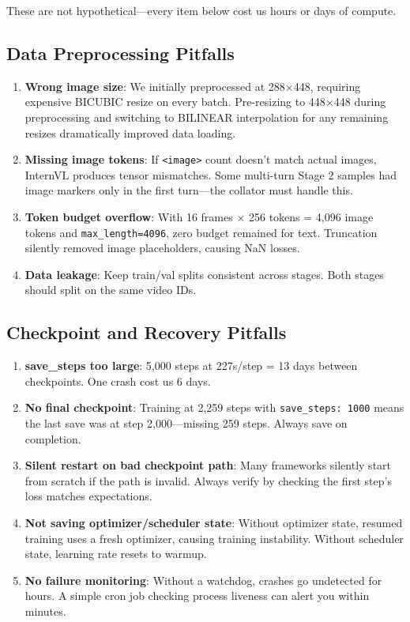 \documentclass[11pt,a4paper]{article}
\begin{document}
These are not hypothetical---every item below cost us hours or days of compute.

\subsection{Data Preprocessing Pitfalls}

\begin{enumerate}
    \item \textbf{Wrong image size}: We initially preprocessed at 288$\times$448, requiring expensive BICUBIC resize on every batch. Pre-resizing to 448$\times$448 during preprocessing and switching to BILINEAR interpolation for any remaining resizes dramatically improved data loading.
    \item \textbf{Missing image tokens}: If \texttt{<image>} count doesn't match actual images, InternVL produces tensor mismatches. Some multi-turn Stage 2 samples had image markers only in the first turn---the collator must handle this.
    \item \textbf{Token budget overflow}: With 16 frames $\times$ 256 tokens = 4,096 image tokens and \texttt{max\_length=4096}, zero budget remained for text. Truncation silently removed image placeholders, causing NaN losses.
    \item \textbf{Data leakage}: Keep train/val splits consistent across stages. Both stages should split on the same video IDs.
\end{enumerate}

\subsection{Checkpoint and Recovery Pitfalls}

\begin{enumerate}
    \item \textbf{save\_steps too large}: 5,000 steps at 227s/step = 13 days between checkpoints. One crash cost us 6 days.
    \item \textbf{No final checkpoint}: Training at 2,259 steps with \texttt{save\_steps: 1000} means the last save was at step 2,000---missing 259 steps. Always save on completion.
    \item \textbf{Silent restart on bad checkpoint path}: Many frameworks silently start from scratch if the path is invalid. Always verify by checking the first step's loss matches expectations.
    \item \textbf{Not saving optimizer/scheduler state}: Without optimizer state, resumed training uses a fresh optimizer, causing training instability. Without scheduler state, learning rate resets to warmup.
    \item \textbf{No failure monitoring}: Without a watchdog, crashes go undetected for hours. A simple cron job checking process liveness can alert you within minutes.
\end{enumerate}
\end{document}
